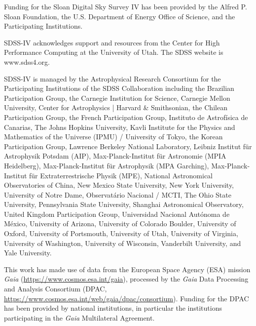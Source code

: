 \documentclass[modern,linenumbers]{aastex631}
\begin{document}
\begin{acknowledgments}
    Funding for the Sloan Digital Sky 
    Survey IV has been provided by the 
    Alfred P. Sloan Foundation, the U.S. 
    Department of Energy Office of 
    Science, and the Participating 
    Institutions. 
    
    SDSS-IV acknowledges support and 
    resources from the Center for High 
    Performance Computing  at the 
    University of Utah. The SDSS 
    website is www.sdss4.org.
    
    SDSS-IV is managed by the 
    Astrophysical Research Consortium 
    for the Participating Institutions 
    of the SDSS Collaboration including 
    the Brazilian Participation Group, 
    the Carnegie Institution for Science, 
    Carnegie Mellon University, Center for 
    Astrophysics | Harvard \& 
    Smithsonian, the Chilean Participation 
    Group, the French Participation Group, 
    Instituto de Astrof\'isica de 
    Canarias, The Johns Hopkins 
    University, Kavli Institute for the 
    Physics and Mathematics of the 
    Universe (IPMU) / University of 
    Tokyo, the Korean Participation Group, 
    Lawrence Berkeley National Laboratory, 
    Leibniz Institut f\"ur Astrophysik 
    Potsdam (AIP),  Max-Planck-Institut 
    f\"ur Astronomie (MPIA Heidelberg), 
    Max-Planck-Institut f\"ur 
    Astrophysik (MPA Garching), 
    Max-Planck-Institut f\"ur 
    Extraterrestrische Physik (MPE), 
    National Astronomical Observatories of 
    China, New Mexico State University, 
    New York University, University of 
    Notre Dame, Observat\'ario 
    Nacional / MCTI, The Ohio State 
    University, Pennsylvania State 
    University, Shanghai 
    Astronomical Observatory, United 
    Kingdom Participation Group, 
    Universidad Nacional Aut\'onoma 
    de M\'exico, University of Arizona, 
    University of Colorado Boulder, 
    University of Oxford, University of 
    Portsmouth, University of Utah, 
    University of Virginia, University 
    of Washington, University of 
    Wisconsin, Vanderbilt University, 
    and Yale University.
    
    This work has made use of data from the European Space Agency (ESA) mission
    {\it Gaia} (\url{https://www.cosmos.esa.int/gaia}), processed by the {\it Gaia}
    Data Processing and Analysis Consortium (DPAC,
    \url{https://www.cosmos.esa.int/web/gaia/dpac/consortium}). Funding for the DPAC
    has been provided by national institutions, in particular the institutions
    participating in the {\it Gaia} Multilateral Agreement.

\end{acknowledgments}
\end{document}
